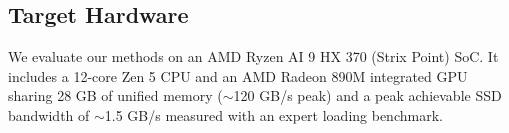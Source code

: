 \subsection{Target Hardware}

We evaluate our methods on an AMD Ryzen AI 9 HX 370 (Strix Point) SoC. It includes a 12-core Zen 5 CPU and an AMD Radeon 890M integrated GPU sharing 28 GB of unified memory ($\sim$120 GB/s peak) and a peak achievable SSD bandwidth of $\sim$1.5 GB/s measured with an expert loading benchmark.